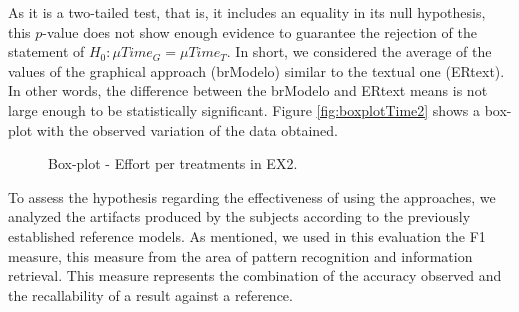 As it is a two-tailed test, that is, it includes an equality in its null hypothesis, this $p$-value does not show enough evidence to guarantee the rejection of the statement of $H_0 : \mu Time_G = \mu Time_T$.
In short, we considered the average of the values of the graphical approach (brModelo) similar to the textual one (ERtext).
In other words, the difference between the brModelo and ERtext means is not large enough to be statistically significant.
Figure \ref{fig:boxplotTime2} shows a box-plot with the observed variation of the data obtained.

\begin{figure}[!htb]
        \centering
        \caption{Box-plot - Effort per treatments in EX2.}
        \label{fig:boxplotTempo2}
        
\end{figure}

To assess the hypothesis regarding the effectiveness of using the approaches, we analyzed the artifacts produced by the subjects according to the previously established reference models.
As mentioned, we used in this evaluation the F1 measure, this measure from the area of pattern recognition and information retrieval.
This measure represents the combination of the accuracy observed and the recallability of a result against a reference.

